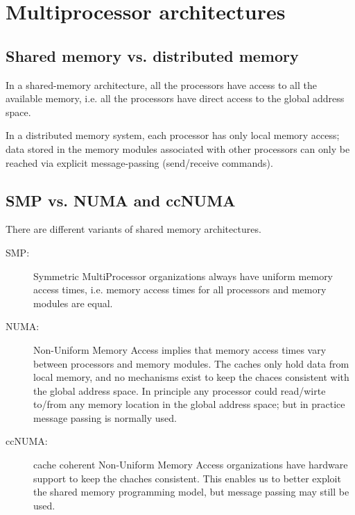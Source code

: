 
\section{Multiprocessor architectures} %
\label{sec:multiprocessor_architectures}

\subsection{Shared memory vs. distributed memory} %
\label{sub:shared_memory_vs_distributed_memory}

In a shared-memory architecture, all the processors have access to all the available memory, i.e. all the processors have direct access to the global address space.

In a distributed memory system, each processor has only local memory access; data stored in the memory modules associated with other processors can only be reached via explicit message-passing (send/receive commands).


\subsection{SMP vs. NUMA and ccNUMA} %
\label{sub:numa_vs_ccnuma}
There are different variants of shared memory architectures.

\begin{description}
  \item[SMP:] Symmetric MultiProcessor organizations always have uniform memory access times, i.e. memory access times for all processors and memory modules are equal.
  \item[NUMA:] Non-Uniform Memory Access implies that memory access times vary between processors and memory modules. The caches only hold data from local memory, and no mechanisms exist to keep the chaces consistent with the global address space. In principle any processor could read/wirte to/from any memory location in the global address space; but in practice message passing is normally used.
  \item[ccNUMA:] cache coherent Non-Uniform Memory Access organizations have hardware support to keep the chaches consistent. This enables us to better exploit the shared memory programming model, but message passing may still be used.
\end{description}

